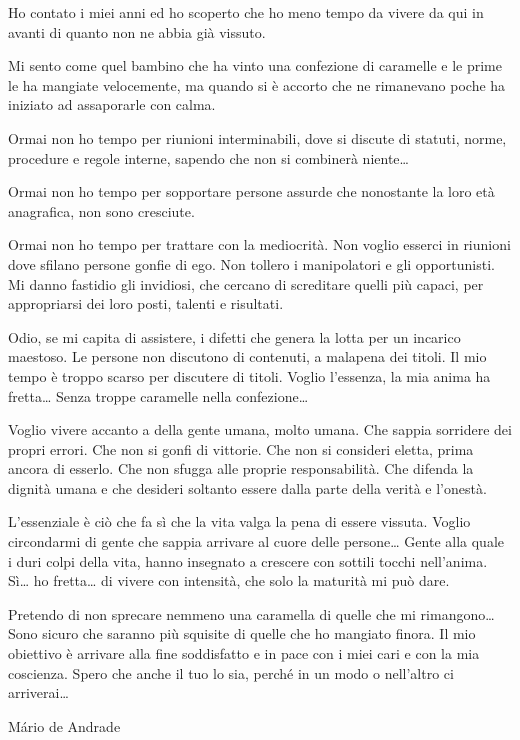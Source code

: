\documentclass[12pt]{book} %
\begin{document}
\begin{mdframed}[linewidth=1pt]
Ho contato i miei anni ed ho scoperto che ho meno tempo da vivere da qui in avanti di quanto non ne abbia già vissuto.

Mi sento come quel bambino che ha vinto una confezione di caramelle e le prime le ha mangiate velocemente, ma quando si
è accorto che ne rimanevano poche ha iniziato ad assaporarle con calma.

Ormai non ho tempo per riunioni interminabili, dove si discute di statuti, norme, procedure e regole interne, sapendo
che non si combinerà niente…

Ormai non ho tempo per sopportare persone assurde che nonostante la loro età anagrafica, non sono cresciute.

Ormai non ho tempo per trattare con la mediocrità. Non voglio esserci in riunioni dove sfilano persone gonfie di ego.
Non tollero i manipolatori e gli opportunisti. Mi danno fastidio gli invidiosi, che cercano di screditare quelli più
capaci, per appropriarsi dei loro posti, talenti e risultati.

Odio, se mi capita di assistere, i difetti che genera la lotta per un incarico maestoso. Le persone non discutono di
contenuti, a malapena dei titoli. Il mio tempo è troppo scarso per discutere di titoli. Voglio
l'essenza, la mia anima ha fretta… Senza troppe caramelle nella confezione…

Voglio vivere accanto a della gente umana, molto umana. Che sappia sorridere dei propri errori. Che non si gonfi di
vittorie. Che non si consideri eletta, prima ancora di esserlo. Che non sfugga alle proprie responsabilità. Che difenda
la dignità umana e che desideri soltanto essere dalla parte della verità e l'onestà.

L'essenziale è ciò che fa sì che la vita valga la pena di essere vissuta. Voglio circondarmi di
gente che sappia arrivare al cuore delle persone… Gente alla quale i duri colpi della vita, hanno insegnato a crescere
con sottili tocchi nell'anima. Sì… ho fretta… di vivere con intensità, che solo la maturità mi può
dare.

Pretendo di non sprecare nemmeno una caramella di quelle che mi rimangono… Sono sicuro che saranno più squisite di
quelle che ho mangiato finora. Il mio obiettivo è arrivare alla fine soddisfatto e in pace con i miei cari e con la mia
coscienza. Spero che anche il tuo lo sia, perché in un modo o nell'altro ci arriverai…

Mário de Andrade
\end{mdframed}
\end{document}
